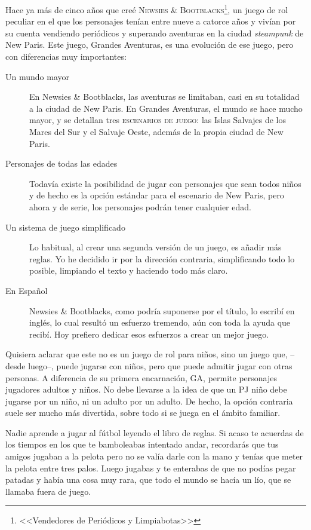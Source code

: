 


Hace ya más de cinco años que creé \textsc{Newsies \& Bootblacks}\footnote{<<Vendedores de Periódicos y Limpiabotas>>}, un juego de rol peculiar en el que los personajes tenían entre nueve a catorce años y vivían por su cuenta vendiendo periódicos y superando aventuras en la ciudad \emph{steampunk} de New Paris. Este juego, Grandes Aventuras, es una evolución de ese juego, pero con diferencias muy importantes:

\begin{description}
\item[Un mundo mayor] En Newsies \& Bootblacks, las aventuras se limitaban, casi en su totalidad a la ciudad de New Paris. En Grandes Aventuras, el mundo se hace mucho mayor, y se detallan tres \textsc{escenarios de juego}: las Islas Salvajes de los Mares del Sur y el Salvaje Oeste, además de la propia ciudad de New Paris.
\item[Personajes de todas las edades] Todavía existe la posibilidad de jugar con personajes que sean todos niños y de hecho es la opción estándar para el escenario de New Paris, pero ahora y de serie, los personajes podrán tener cualquier edad.
\item[Un sistema de juego simplificado] Lo habitual, al crear una segunda versión de un juego, es añadir más reglas. Yo he decidido ir por la dirección contraria, simplificando todo lo posible, limpiando el texto y haciendo todo más claro. 
\item[En Español] Newsies \& Bootblacks, como podría suponerse por el título, lo escribí en inglés, lo cual resultó un esfuerzo tremendo, aún con toda la ayuda que recibí. Hoy prefiero dedicar esos esfuerzos a crear un mejor juego.
\end{description}

Quisiera aclarar que este no es un juego de rol para niños, sino un juego que, --desde luego--, puede jugarse con niños, pero que puede admitir jugar con otras personas. A diferencia de su primera encarnación, GA, permite personajes jugadores adultos y niños. No debe llevarse a la idea de que un PJ niño debe jugarse por un niño, ni un adulto por un adulto. De hecho, la opción contraria suele ser mucho más divertida, sobre todo si se juega en el ámbito familiar.


Nadie aprende a jugar al fútbol leyendo el libro de reglas. Si acaso te acuerdas de los tiempos en los que te bamboleabas intentado andar, recordarás que tus amigos jugaban a la pelota pero no se valía darle con la mano y tenías que meter la pelota entre tres palos. Luego jugabas y te enterabas de que no podías pegar patadas y había una cosa muy rara, que todo el mundo se hacía un lío, que se llamaba fuera de juego.

